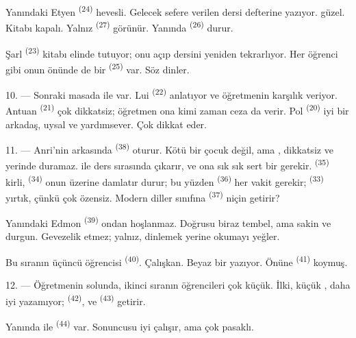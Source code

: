 Yanındaki Etyen \textsuperscript{(24)} hevesli. Gelecek sefere verilen dersi
defterine yazıyor.  güzel. Kitabı kapalı. Yalnız
 \textsuperscript{(27)} görünür. Yanında 
\textsuperscript{(26)} durur.

Şarl \textsuperscript{(23)} kitabı elinde tutuyor; onu açıp dersini yeniden
tekrarlıyor. Her öğrenci gibi onun önünde de bir 
\textsuperscript{(25)} var. Söz dinler.

10. --- Sonraki masada  ile  var. Lui
 \textsuperscript{(22)} anlatıyor ve öğretmenin
 karşılık veriyor. Antuan \textsuperscript{(21)} çok
dikkatsiz; öğretmen ona kimi zaman ceza da verir. Pol
\textsuperscript{(20)} iyi bir arkadaş, uysal ve yardımsever. Çok dikkat
eder.

\VUsaut{4.2mm}
\VUsaut{3.2mm}

11. --- Anri'nin arkasında  \textsuperscript{(38)} oturur. Kötü bir
çocuk değil, ama , dikkatsiz ve yerinde duramaz.
 ile  ders sırasında
 çıkarır, ve ona sık sık sert bir  gerekir.
 \textsuperscript{(35)} kirli, 
\textsuperscript{(34)} onun üzerine  damlatır durur;
bu yüzden  \textsuperscript{(36)} her vakit gerekir;
 \textsuperscript{(33)} yırtık, çünkü çok özensiz. Modern
diller sınıfına  \textsuperscript{(37)} niçin getirir?

Yanındaki Edmon \textsuperscript{(39)} ondan hoşlanmaz. Doğrusu biraz
tembel, ama sakin ve durgun. Gevezelik etmez; yalnız, dinlemek yerine
  okumayı yeğler.

Bu sıranın üçüncü öğrencisi  \textsuperscript{(40)}.
Çalışkan. Beyaz bir   yazıyor. Önüne
 \textsuperscript{(41)} koymuş.

12. --- Öğretmenin solunda, ikinci sıranın öğrencileri çok küçük. İlki,
küçük , daha iyi yazamıyor; 
\textsuperscript{(42)},  ve 
\textsuperscript{(43)} getirir.

Yanında  ile  \textsuperscript{(44)} var.
Sonuncusu iyi çalışır, ama  çok pasaklı.

